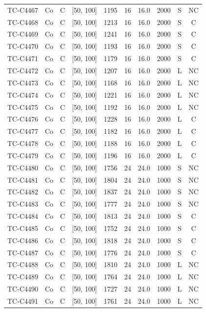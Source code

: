 \begin{longtable}{lccccccccc}
TC-C4467 & Co & C & [50, 100] & 1195 & 16 & 16.0 & 2000 & S & NC \\
TC-C4468 & Co & C & [50, 100] & 1213 & 16 & 16.0 & 2000 & S & C \\
TC-C4469 & Co & C & [50, 100] & 1241 & 16 & 16.0 & 2000 & S & C \\
TC-C4470 & Co & C & [50, 100] & 1193 & 16 & 16.0 & 2000 & S & C \\
TC-C4471 & Co & C & [50, 100] & 1179 & 16 & 16.0 & 2000 & S & C \\
TC-C4472 & Co & C & [50, 100] & 1207 & 16 & 16.0 & 2000 & L & NC \\
TC-C4473 & Co & C & [50, 100] & 1168 & 16 & 16.0 & 2000 & L & NC \\
TC-C4474 & Co & C & [50, 100] & 1221 & 16 & 16.0 & 2000 & L & NC \\
TC-C4475 & Co & C & [50, 100] & 1192 & 16 & 16.0 & 2000 & L & NC \\
TC-C4476 & Co & C & [50, 100] & 1228 & 16 & 16.0 & 2000 & L & C \\
TC-C4477 & Co & C & [50, 100] & 1182 & 16 & 16.0 & 2000 & L & C \\
TC-C4478 & Co & C & [50, 100] & 1188 & 16 & 16.0 & 2000 & L & C \\
TC-C4479 & Co & C & [50, 100] & 1196 & 16 & 16.0 & 2000 & L & C \\
TC-C4480 & Co & C & [50, 100] & 1756 & 24 & 24.0 & 1000 & S & NC \\
TC-C4481 & Co & C & [50, 100] & 1804 & 24 & 24.0 & 1000 & S & NC \\
TC-C4482 & Co & C & [50, 100] & 1837 & 24 & 24.0 & 1000 & S & NC \\
TC-C4483 & Co & C & [50, 100] & 1777 & 24 & 24.0 & 1000 & S & NC \\
TC-C4484 & Co & C & [50, 100] & 1813 & 24 & 24.0 & 1000 & S & C \\
TC-C4485 & Co & C & [50, 100] & 1752 & 24 & 24.0 & 1000 & S & C \\
TC-C4486 & Co & C & [50, 100] & 1818 & 24 & 24.0 & 1000 & S & C \\
TC-C4487 & Co & C & [50, 100] & 1776 & 24 & 24.0 & 1000 & S & C \\
TC-C4488 & Co & C & [50, 100] & 1810 & 24 & 24.0 & 1000 & L & NC \\
TC-C4489 & Co & C & [50, 100] & 1764 & 24 & 24.0 & 1000 & L & NC \\
TC-C4490 & Co & C & [50, 100] & 1727 & 24 & 24.0 & 1000 & L & NC \\
TC-C4491 & Co & C & [50, 100] & 1761 & 24 & 24.0 & 1000 & L & NC \\

\end{longtable}
